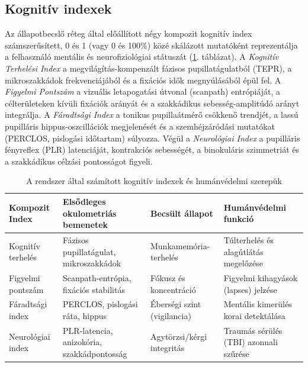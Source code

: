 \documentclass[12pt,a4paper,oneside]{book}
\begin{document}
\subsection{Kognitív indexek}

Az állapotbecslő réteg által előállított négy kompozit kognitív index számszerűsített, 0 és 1 (vagy 0 és 100\%) közé skálázott mutatóként reprezentálja a felhasználó mentális és neurofiziológiai státuszát (\ref{tab:indices}. táblázat). A \emph{Kognitív Terhelési Index} a megvilágítás-kompenzált fázisos pupillatágulatból (TEPR), a mikroszakkádok frekvenciájából és a fixációs idők megnyúlásából épül fel. A \emph{Figyelmi Pontszám} a vizuális letapogatási útvonal (scanpath) entrópiáját, a célterületeken kívüli fixációk arányát és a szakkádikus sebesség-amplitúdó arányt integrálja. A \emph{Fáradtsági Index} a tonikus pupillaátmérő csökkenő trendjét, a lassú pupilláris hippus-oszcillációk megjelenését és a szemhéjzáródási mutatókat (PERCLOS, pislogási időtartam) súlyozza. Végül a \emph{Neurológiai Index} a pupilláris fényreflex (PLR) latenciáját, kontrakciós sebességét, a binokuláris szimmetriát és a szakkádikus célzási pontosságot figyeli.

\begin{table}[H]
    \centering
    \renewcommand{\arraystretch}{1.5}
    \caption{A rendszer által számított kognitív indexek és humánvédelmi szerepük}
    \label{tab:indices}
    \begin{tabular}{>{\centering\arraybackslash}p{3.5cm} >{\raggedright\arraybackslash}p{4.2cm} >{\centering\arraybackslash}p{3cm} >{\raggedright\arraybackslash}p{3.8cm}}
        \toprule
        \textbf{Kompozit Index} & \textbf{Elsődleges okulometriás bemenetek} & \textbf{Becsült állapot} & \textbf{Humánvédelmi funkció} \\
        \midrule
        Kognitív terhelés & Fázisos pupillatágulat, mikroszakkádok & Munkamemória-terhelés & Túlterhelés és alagútlátás megelőzése \\
        Figyelmi pontszám & Scanpath-entrópia, fixációs stabilitás & Fókusz és koncentráció & Figyelmi kihagyások (lapses) jelzése \\
        Fáradtsági index & PERCLOS, pislogási ráta, hippus & Éberségi szint (vigilancia) & Mentális kimerülés korai detektálása \\
        Neurológiai index & PLR-latencia, anizokória, szakkádpontosság & Agytörzsi/kérgi integritás & Traumás sérülés (TBI) azonnali szűrése \\
        \bottomrule
    \end{tabular}
\end{table}
\end{document}
